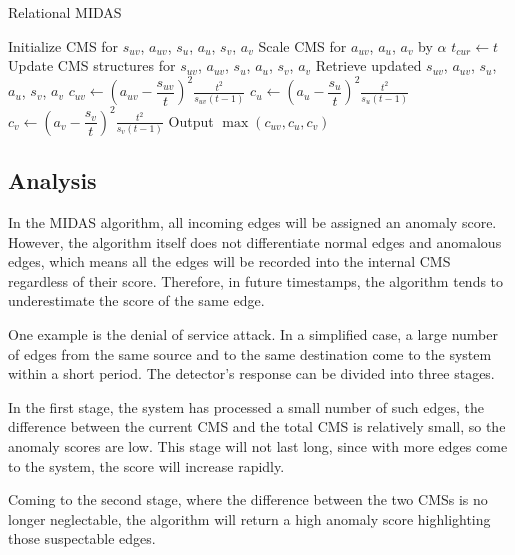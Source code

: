 \documentclass[5p]{elsarticle}
\begin{document}
	\begin{algorithm}[!htb]
		\caption{Relational MIDAS}
		\label{alg:MIDAS.Relational}
		\begin{algorithmic}[1]
			\State Initialize CMS for $s_{uv}$, $a_{uv}$, $s_u$, $a_u$, $s_v$, $a_v$
			\State Scale CMS for $a_{uv}$, $a_u$, $a_v$ by $\alpha$
			\State $t_{cur}\gets t$
			\EndIf
			\State Update CMS structures for $s_{uv}$, $a_{uv}$, $s_u$, $a_u$, $s_v$, $a_v$
			\State Retrieve updated $s_{uv}$, $a_{uv}$, $s_u$, $a_u$, $s_v$, $a_v$
			\State $c_{uv}\gets\left(a_{uv}-\dfrac{s_{uv}}{t}\right)^2\frac{t^2}{s_{uv}(t-1)}$
			\State $c_u\gets\left(a_u-\dfrac{s_u}{t}\right)^2\frac{t^2}{s_u(t-1)}$
			\State $c_v\gets\left(a_v-\dfrac{s_v}{t}\right)^2\frac{t^2}{s_v(t-1)}$
			\State Output $\max(c_{uv},c_u,c_v)$
			\EndWhile
		\end{algorithmic}
	\end{algorithm}

	\subsection{Analysis}

	In the MIDAS algorithm, all incoming edges will be assigned an anomaly score. However, the algorithm itself does not differentiate normal edges and anomalous edges, which means all the edges will be recorded into the internal CMS regardless of their score. Therefore, in future timestamps, the algorithm tends to underestimate the score of the same edge.

	One example is the denial of service attack. In a simplified case, a large number of edges from the same source and to the same destination come to the system within a short period. The detector's response can be divided into three stages.

	In the first stage, the system has processed a small number of such edges, the difference between the current CMS and the total CMS is relatively small, so the anomaly scores are low. This stage will not last long, since with more edges come to the system, the score will increase rapidly.

	Coming to the second stage, where the difference between the two CMSs is no longer neglectable, the algorithm will return a high anomaly score highlighting those suspectable edges.
\end{document}
